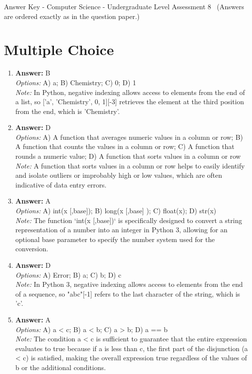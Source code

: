 \documentclass[12pt]{article}
\begin{document}
\begin{center}
Answer Key - Computer Science - Undergraduate Level Assessment 8 \
\small (Answers are ordered exactly as in the question paper.)
\end{center}

\section*{Multiple Choice}
\begin{enumerate}[label=\arabic*.]
\item \textbf{Answer:} B
\\ \textit{Options:} A) a; B) Chemistry; C) 0; D) 1
\\ \textit{Note:} In Python, negative indexing allows access to elements from the end of a list, so ['a', 'Chemistry', 0, 1][-3] retrieves the element at the third position from the end, which is 'Chemistry'.
\item \textbf{Answer:} D
\\ \textit{Options:} A) A function that averages numeric values in a column or row; B) A function that counts the values in a column or row; C) A function that rounds a numeric value; D) A function that sorts values in a column or row
\\ \textit{Note:} A function that sorts values in a column or row helps to easily identify and isolate outliers or improbably high or low values, which are often indicative of data entry errors.
\item \textbf{Answer:} A
\\ \textit{Options:} A) int(x [,base]); B) long(x [,base] ); C) float(x); D) str(x)
\\ \textit{Note:} The function `int(x [,base])` is specifically designed to convert a string representation of a number into an integer in Python 3, allowing for an optional base parameter to specify the number system used for the conversion.
\item \textbf{Answer:} D
\\ \textit{Options:} A) Error; B) a; C) b; D) c
\\ \textit{Note:} In Python 3, negative indexing allows access to elements from the end of a sequence, so "abc"[-1] refers to the last character of the string, which is 'c'.
\item \textbf{Answer:} A
\\ \textit{Options:} A) a \textless{} c; B) a \textless{} b; C) a \textgreater{} b; D) a == b
\\ \textit{Note:} The condition a \textless{} c is sufficient to guarantee that the entire expression evaluates to true because if a is less than c, the first part of the disjunction (a \textless{} c) is satisfied, making the overall expression true regardless of the values of b or the additional conditions.
\end{enumerate}
\end{document}

